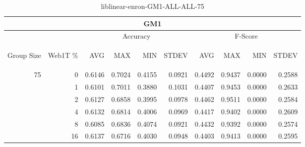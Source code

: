 \begin{center}
\begin{table}[htbp]
\begin{tabular}{ | r | r | r | r | r | r | r | r | r | r |}
\hline
\multicolumn{10}{|c|}{GM1}\\
\hline
 & & \multicolumn{4}{|c|}{Accuracy} & \multicolumn{4}{|c|}{F-Score}\\ \cline{3-10}
\begin{sideways}Group Size\end{sideways} & \begin{sideways}Web1T \%\end{sideways} & \begin{sideways}AVG\end{sideways} & \begin{sideways}MAX\end{sideways} & \begin{sideways}MIN\end{sideways} & \begin{sideways}STDEV\end{sideways} & \begin{sideways}AVG\end{sideways} & \begin{sideways}MAX\end{sideways} & \begin{sideways}MIN\end{sideways} & \begin{sideways}STDEV\end{sideways}\\
\hline
\multirow{5}{*}{75}
 & 0 & 0.6146 & 0.7024 & 0.4155 & 0.0921 & 0.4492 & 0.9437 & 0.0000 & 0.2588\\ \cline{2-10}
 & 1 & 0.6101 & 0.7011 & 0.3880 & 0.1031 & 0.4407 & 0.9453 & 0.0000 & 0.2633\\ \cline{2-10}
 & 2 & 0.6127 & 0.6858 & 0.3995 & 0.0978 & 0.4462 & 0.9511 & 0.0000 & 0.2584\\ \cline{2-10}
 & 4 & 0.6132 & 0.6814 & 0.4006 & 0.0969 & 0.4417 & 0.9402 & 0.0000 & 0.2609\\ \cline{2-10}
 & 8 & 0.6085 & 0.6836 & 0.4074 & 0.0921 & 0.4432 & 0.9392 & 0.0000 & 0.2574\\ \cline{2-10}
 & 16 & 0.6137 & 0.6716 & 0.4030 & 0.0948 & 0.4403 & 0.9413 & 0.0000 & 0.2595\\ \cline{2-10}
\hline
\end{tabular}
\caption{liblinear-enron-GM1-ALL-ALL-75}
\label{table:liblinear-enron-GM1-ALL-ALL-75}
\end{table}
\end{center}

